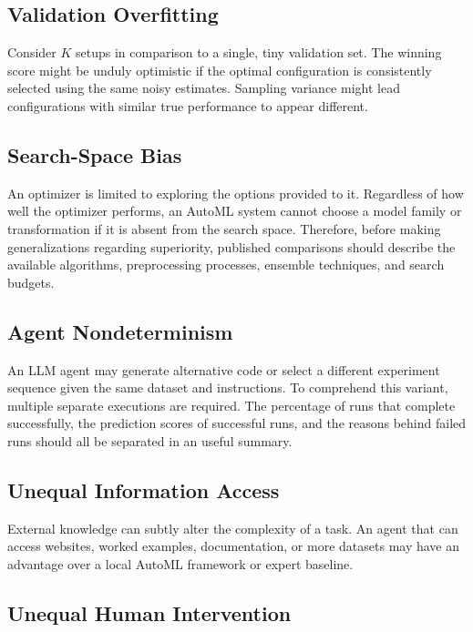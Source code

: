 \documentclass[acmsmall,screen]{acmart}
\begin{document}
\subsection{Validation Overfitting}

Consider $K$ setups in comparison to a single, tiny validation set. The winning score might be unduly optimistic if the optimal configuration is consistently selected using the same noisy estimates. Sampling variance might lead configurations with similar true performance to appear different.

\subsection{Search-Space Bias}

An optimizer is limited to exploring the options provided to it. Regardless of how well the optimizer performs, an AutoML system cannot choose a model family or transformation if it is absent from the search space. Therefore, before making generalizations regarding superiority, published comparisons should describe the available algorithms, preprocessing processes, ensemble techniques, and search budgets.

\subsection{Agent Nondeterminism}

An LLM agent may generate alternative code or select a different experiment sequence given the same dataset and instructions. To comprehend this variant, multiple separate executions are required. The percentage of runs that complete successfully, the prediction scores of successful runs, and the reasons behind failed runs should all be separated in an useful summary.

\subsection{Unequal Information Access}

External knowledge can subtly alter the complexity of a task. An agent that can access websites, worked examples, documentation, or more datasets may have an advantage over a local AutoML framework or expert baseline.

\subsection{Unequal Human Intervention}
\end{document}
